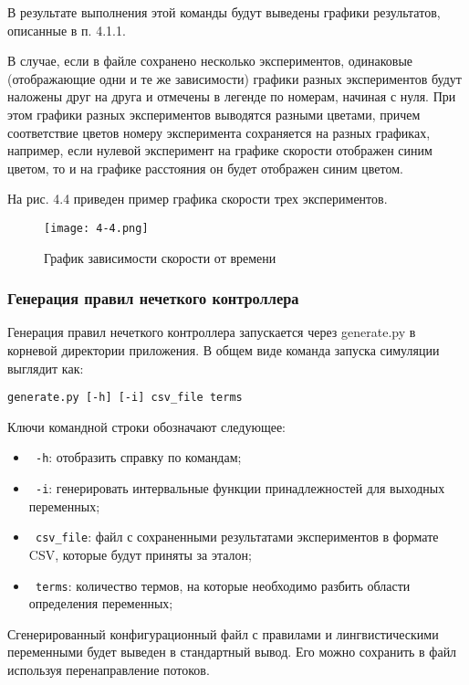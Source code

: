 В результате выполнения этой команды будут выведены графики результатов, описанные в п. 4.1.1.

В случае, если в файле сохранено несколько экспериментов, одинаковые (отображающие одни и те же зависимости) графики разных экспериментов будут наложены друг на друга и отмечены в легенде по номерам, начиная с  нуля. При этом графики разных экспериментов выводятся разными цветами, причем соответствие цветов номеру эксперимента сохраняется на разных графиках, например, если нулевой эксперимент на графике скорости отображен синим цветом, то и на графике расстояния он будет отображен синим цветом.

На рис. 4.4 приведен пример графика скорости трех экспериментов.

\begin{figure}[ht]
  \centering
  \texttt{[image: 4-4.png]}
  \caption{График зависимости скорости от времени }
\end{figure}

\subsubsection{ Генерация правил нечеткого контроллера }

Генерация правил нечеткого контроллера запускается через generate.py в корневой директории приложения. В общем виде команда запуска симуляции выглядит как:

\begin{lstlisting}[style=pythonstyle,caption={  }, label=lst:func:1]
  generate.py [-h] [-i] csv_file terms
\end{lstlisting}

Ключи командной строки обозначают следующее:

\begin{itemize}
	\item \lstinline! -h!: отобразить справку по командам;
	\item \lstinline! -i!: генерировать интервальные функции принадлежностей для выходных переменных;
	\item \lstinline! csv_file!: файл с сохраненными результатами экспериментов в формате CSV, которые будут приняты за эталон;
	\item \lstinline! terms!: количество термов, на которые необходимо разбить области определения переменных;
\end{itemize}

Сгенерированный конфигурационный файл с правилами и лингвистическими переменными будет выведен в стандартный вывод. Его можно сохранить в файл используя перенаправление потоков.

